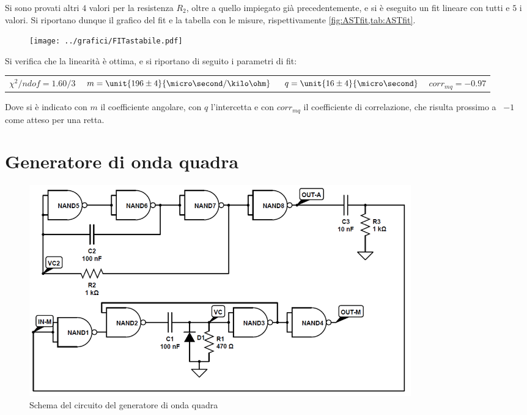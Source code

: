 \documentclass[a4paper,10pt]{article}
\begin{document}
Si sono provati altri $4$ valori per la resistenza $R_2$, oltre a quello impiegato già precedentemente, e si è eseguito un fit lineare con tutti e $5$ i valori. Si riportano dunque il grafico del fit e la tabella con le misure, rispettivamente \cref{fig:ASTfit,tab:ASTfit}.

\begin{figure}[H]
	\centering
	\begin{minipage}{0.49\textwidth}
		\centering
		\texttt{[image: ../grafici/FITastabile.pdf]}
		\caption{}
		\label{fig:ASTfit}
	\end{minipage}
	\begin{minipage}{0.49\textwidth}
		\centering
		\resizebox{0.7\textwidth}{!}{
			}
		\label{tab:ASTfit}
	\end{minipage}
\end{figure}

Si verifica che la linearità è ottima, e si riportano di seguito i parametri di fit:

\begin{table}[H]
	\centering
	\begin{tabular}{cccc}
		$\chi^2/ndof = 1.60/3$ & $m = \unit{196 \pm 4}{\micro\second / \kilo\ohm}$ & $q = \unit{16 \pm 4}{\micro\second}$ & $corr_{mq} = -0.97$\\
	\end{tabular}
\end{table}

Dove si è indicato con $m$ il coefficiente angolare, con $q$ l'intercetta e con $corr_{mq}$ il coefficiente di correlazione, che risulta prossimo a ~$-1$ come atteso per una retta.

\section{Generatore di onda quadra}

\begin{figure}[H]
	\centering
	\includegraphics[width=0.8\textwidth]{../grafici/SqGen.png}
	\caption{Schema del circuito del generatore di onda quadra}
	\label{fig:SQGEN}
\end{figure}
\end{document}
